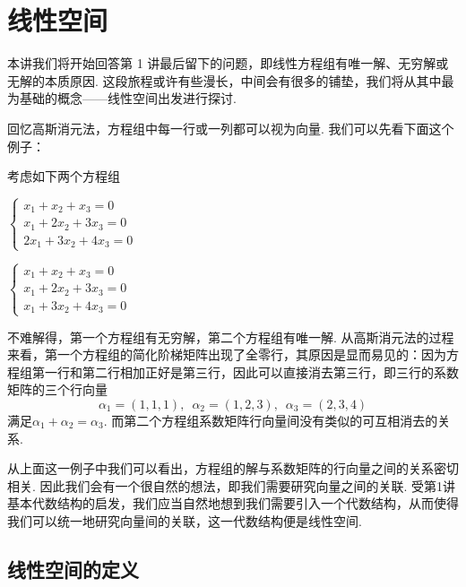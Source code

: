 \chapter{线性空间}

本讲我们将开始回答第 1 讲最后留下的问题，即线性方程组有唯一解、无穷解或无解的本质原因. 这段旅程或许有些漫长，中间会有很多的铺垫，我们将从其中最为基础的概念——线性空间出发进行探讨.

回忆高斯消元法，方程组中每一行或一列都可以视为向量. 我们可以先看下面这个例子：
\begin{example}\label{ex:2:线性空间引入}
    考虑如下两个方程组
    \begin{multicols}{2}
        \item $\begin{cases}
                x_1+x_2+x_3=0   \\
                x_1+2x_2+3x_3=0 \\
                2x_1+3x_2+4x_3=0
            \end{cases}$

        \item $\begin{cases}
                x_1+x_2+x_3=0   \\
                x_1+2x_2+3x_3=0 \\
                x_1+3x_2+4x_3=0
            \end{cases}$
    \end{multicols}
    不难解得，第一个方程组有无穷解，第二个方程组有唯一解. 从高斯消元法的过程来看，第一个方程组的简化阶梯矩阵出现了全零行，其原因是显而易见的：因为方程组第一行和第二行相加正好是第三行，因此可以直接消去第三行，即三行的系数矩阵的三个行向量
    \[\alpha_1=(1,1,1),\enspace\alpha_2=(1,2,3),\enspace\alpha_3=(2,3,4)\]
    满足$\alpha_1+\alpha_2=\alpha_3$. 而第二个方程组系数矩阵行向量间没有类似的可互相消去的关系.
\end{example}

从上面这一例子中我们可以看出，方程组的解与系数矩阵的行向量之间的关系密切相关. 因此我们会有一个很自然的想法，即我们需要研究向量之间的关联. 受第1讲基本代数结构的启发，我们应当自然地想到我们需要引入一个代数结构，从而使得我们可以统一地研究向量间的关联，这一代数结构便是线性空间.

\section{线性空间的定义}

